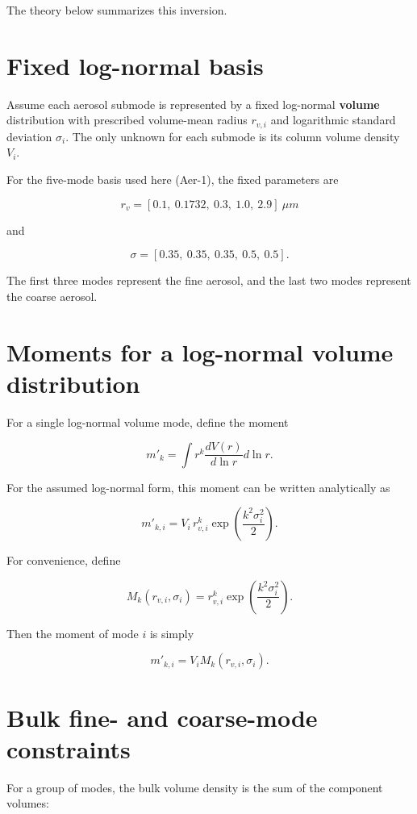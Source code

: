 \documentclass[
  letterpaper,
]{scrbook}
\begin{document}
The theory below summarizes this inversion.

\section{Fixed log-normal basis}\label{fixed-log-normal-basis}

Assume each aerosol submode is represented by a fixed log-normal
\textbf{volume} distribution with prescribed volume-mean radius
\(r_{v,i}\) and logarithmic standard deviation \(\sigma_i\). The only
unknown for each submode is its column volume density \(V_i\).

For the five-mode basis used here (Aer-1), the fixed parameters are

\[
r_v = [0.1,\ 0.1732,\ 0.3,\ 1.0,\ 2.9] \ \mu m
\]

and

\[
\sigma = [0.35,\ 0.35,\ 0.35,\ 0.5,\ 0.5].
\]

The first three modes represent the fine aerosol, and the last two modes
represent the coarse aerosol.

\section{Moments for a log-normal volume
distribution}\label{moments-for-a-log-normal-volume-distribution}

For a single log-normal volume mode, define the moment

\[
m'_k = \int r^k \frac{dV(r)}{d\ln r} d\ln r.
\]

For the assumed log-normal form, this moment can be written analytically
as

\[
m'_{k,i} = V_i \, r_{v,i}^k \exp\left(\frac{k^2 \sigma_i^2}{2}\right).
\]

For convenience, define

\[
M_k(r_{v,i},\sigma_i)=r_{v,i}^k \exp\left(\frac{k^2 \sigma_i^2}{2}\right).
\]

Then the moment of mode \(i\) is simply

\[
m'_{k,i}=V_i M_k(r_{v,i},\sigma_i).
\]

\section{Bulk fine- and coarse-mode
constraints}\label{bulk-fine--and-coarse-mode-constraints}

For a group of modes, the bulk volume density is the sum of the
component volumes:
\end{document}
